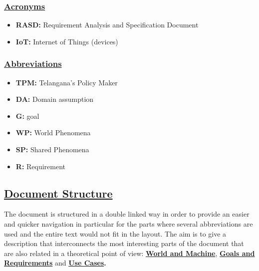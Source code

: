 	\subsubsection[Acronyms]{\hyperlink{toc}{Acronyms}}
		\begin{itemize}
			\item \textbf{RASD:} Requirement Analysis and Specification Document
			\item \textbf{IoT:} Internet of Things (devices)
		\end{itemize}
	
	\subsubsection[Abbreviations]{\hyperlink{toc}{Abbreviations}}
		\begin{itemize}
	        \item \textbf{TPM:} Telangana's Policy Maker
	        \item \textbf{DA:} Domain assumption
	        \item \textbf{G:} goal
			\item \textbf{WP:} World Phenomena
			\item \textbf{SP:} Shared Phenomena
			\item \textbf{R:} Requirement
		\end{itemize}
		
\subsection[Document Structure]{\hyperlink{toc}{Document Structure}}
	The document is structured in a double linked way in order to provide an easier and quicker navigation in particular for the parts where several abbreviations are used and the entire text would not fit in the layout. The aim is to give a description that interconnects the most interesting parts of the document that are also related in a theoretical point of view: \textbf{\hyperref[sec:worldMachine]{World and Machine}},
	\textbf{\hyperref[sec:goalSatisfaction]{Goals and Requirements}}  and \textbf{\hyperref[sec:useCases]{Use Cases}.}\\
	
